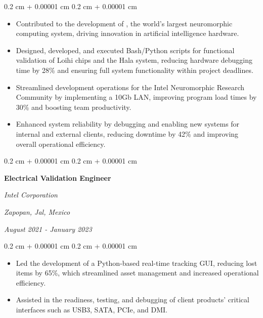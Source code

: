 \documentclass[10pt, letterpaper]{article}
\newenvironment{highlights}{
    \begin{itemize}[
        topsep=0.10 cm,
        parsep=0.10 cm,
        partopsep=0pt,
        itemsep=0pt,
        leftmargin=0.4 cm + 10pt
    ]
}{
    \end{itemize}
} %
\newenvironment{onecolentry}{
    \begin{adjustwidth}{
        0.2 cm + 0.00001 cm
    }{
        0.2 cm + 0.00001 cm
    }
}{
    \end{adjustwidth}
} %
\newenvironment{twocolentry}[2][]{
    \onecolentry
    \def\secondColumn{#2}
    \setcolumnwidth{\fill, 4.5 cm}
    \begin{paracol}{2}
}{
    \switchcolumn \raggedleft \secondColumn
    \end{paracol}
    \endonecolentry
} %
\let\hrefWithoutArrow\href
\renewcommand{\href}[2]{\hrefWithoutArrow{#1}{\ifthenelse{\equal{#2}{}}{ }{#2 }\raisebox{.15ex}{\footnotesize \faExternalLink*}}}
\begin{document}
        \vspace{0.10 cm}
        \begin{onecolentry}
            \begin{highlights}
                \item Contributed to the development of \href{https://newsroom.intel.com/artificial-intelligence/intel-builds-worlds-largest-neuromorphic-system-to-enable-more-sustainable-ai}{Hala Point}, the world’s largest neuromorphic computing system, driving innovation in artificial intelligence hardware.
                \item Designed, developed, and executed Bash/Python scripts for functional validation of Loihi chips and the Hala system, reducing hardware debugging time by 28\% and ensuring full system functionality within project deadlines.
                \item Streamlined development operations for the Intel Neuromorphic Research Community by implementing a 10Gb LAN, improving program load times by 30\% and boosting team productivity.
                \item Enhanced system reliability by debugging and enabling new systems for internal and external clients, reducing downtime by 42\% and improving overall operational efficiency.
            \end{highlights}
        \end{onecolentry}


        \vspace{0.2 cm}

        \begin{twocolentry}{
        \textit{Zapopan, Jal, Mexico}    
            
        \textit{August 2021 - January 2023}}
            \textbf{Electrical Validation Engineer}
            
            \textit{Intel Corporation}
        \end{twocolentry}

        \vspace{0.10 cm}
        \begin{onecolentry}
            \begin{highlights}
                \item Led the development of a Python-based real-time tracking GUI, reducing lost items by 65\%, which streamlined asset management and increased operational efficiency.
                \item Assisted in the readiness, testing, and debugging of client products' critical interfaces such as USB3, SATA, PCIe, and DMI.
            \end{highlights}
        \end{onecolentry}
\end{document}
